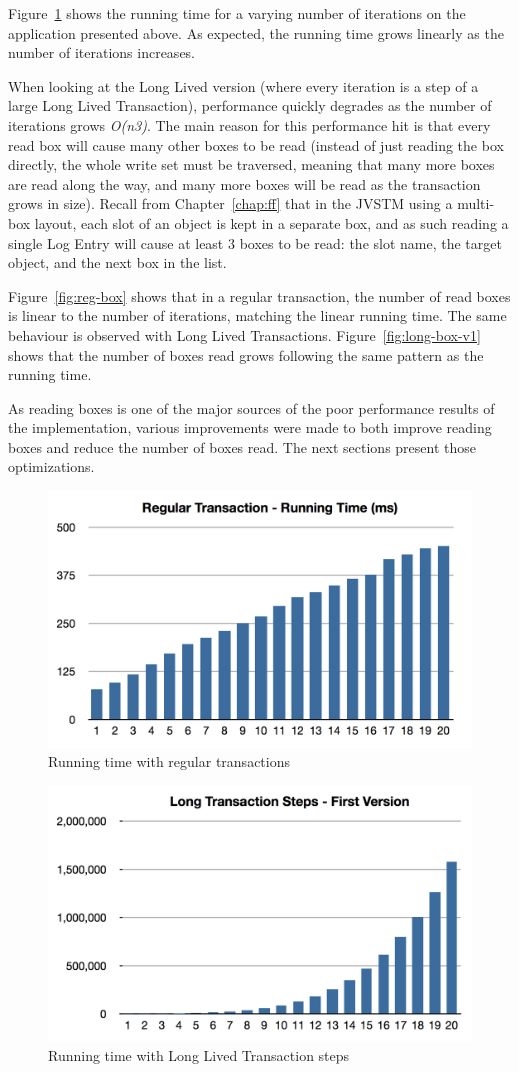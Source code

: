 Figure~\ref{fig:regTime} shows the running time for a varying number
of iterations on the application presented above. As expected, the
running time grows linearly as the number of iterations increases.

When looking at the Long Lived version (where every iteration is a
step of a large Long Lived Transaction), performance quickly degrades
as the number of iterations grows {\it O(n3)}. The main reason for
this performance hit is that every read box will cause many other
boxes to be read (instead of just reading the box directly, the whole
write set must be traversed, meaning that many more boxes are read
along the way, and many more boxes will be read as the transaction
grows in size). Recall from Chapter~\ref{chap:ff} that in the JVSTM
using a multi-box layout, each slot of an object is kept in a separate
box, and as such reading a single Log Entry will cause at least 3
boxes to be read: the slot name, the target object, and the next box
in the list.

Figure~\ref{fig:reg-box} shows that in a regular transaction, the
number of read boxes is linear to the number of iterations, matching
the linear running time. The same behaviour is observed with Long
Lived Transactions. Figure~\ref{fig:long-box-v1} shows that the number
of boxes read grows following the same pattern as the running time.

As reading boxes is one of the major sources of the poor performance
results of the implementation, various improvements were made to both
improve reading boxes and reduce the number of boxes read. The next
sections present those optimizations.

\begin{figure}
\centering
\includegraphics[width=0.7\linewidth]{reg-time}
\caption{Running time with regular transactions}
\label{fig:regTime}
\end{figure}

\begin{figure}
\centering
\includegraphics[width=0.7\linewidth]{long-time-v1}
\caption{Running time with Long Lived Transaction steps}
\end{figure}

